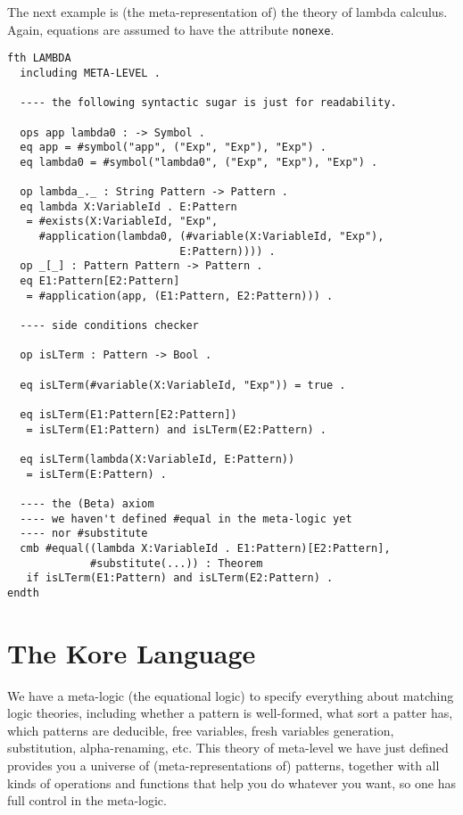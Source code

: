 \documentclass[UTF8]{article}
\theoremstyle{plain}
\theoremstyle{definition}
\theoremstyle{remark}
\begin{document}
The next example is (the meta-representation of) the theory of lambda calculus. Again, equations are assumed to have the attribute \texttt{nonexe}. 

\begin{Verbatim}
fth LAMBDA
  including META-LEVEL .
  
  ---- the following syntactic sugar is just for readability. 

  ops app lambda0 : -> Symbol .
  eq app = #symbol("app", ("Exp", "Exp"), "Exp") .
  eq lambda0 = #symbol("lambda0", ("Exp", "Exp"), "Exp") .
  
  op lambda_._ : String Pattern -> Pattern .
  eq lambda X:VariableId . E:Pattern
   = #exists(X:VariableId, "Exp", 
     #application(lambda0, (#variable(X:VariableId, "Exp"), 
                           E:Pattern)))) .
  op _[_] : Pattern Pattern -> Pattern .
  eq E1:Pattern[E2:Pattern] 
   = #application(app, (E1:Pattern, E2:Pattern))) .
   
  ---- side conditions checker
  
  op isLTerm : Pattern -> Bool .

  eq isLTerm(#variable(X:VariableId, "Exp")) = true .
  
  eq isLTerm(E1:Pattern[E2:Pattern])
   = isLTerm(E1:Pattern) and isLTerm(E2:Pattern) .
   
  eq isLTerm(lambda(X:VariableId, E:Pattern))
   = isLTerm(E:Pattern) .
  
  ---- the (Beta) axiom
  ---- we haven't defined #equal in the meta-logic yet
  ---- nor #substitute
  cmb #equal((lambda X:VariableId . E1:Pattern)[E2:Pattern],
             #substitute(...)) : Theorem
   if isLTerm(E1:Pattern) and isLTerm(E2:Pattern) .
endth
\end{Verbatim}

\section{The Kore Language}

We have a meta-logic (the equational logic) to specify everything about matching logic theories, including whether a pattern is well-formed, what sort a patter has, which patterns are deducible, free variables, fresh variables generation, substitution, alpha-renaming, etc. This theory of meta-level we have just defined provides you a universe of (meta-representations of) patterns, together with all kinds of operations and functions that help you do whatever you want, so one has full control in the meta-logic. 
\end{document}
